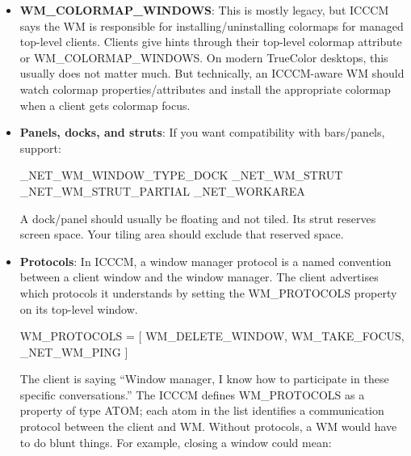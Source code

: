 \documentclass{report}
\begin{document}
\begin{itemize}
\begin{itemize}
                \item Otherwise return it to tiling layout.
                \item Re-run arrange()
            \end{itemize}
        \item \textbf{WM\_COLORMAP\_WINDOWS}:  
            This is mostly legacy, but ICCCM says the WM is responsible for installing/uninstalling colormaps for managed top-level clients. Clients give hints through their top-level colormap attribute or WM\_COLORMAP\_WINDOWS.
            \bigbreak \noindent 
            On modern TrueColor desktops, this usually does not matter much. But technically, an ICCCM-aware WM should watch colormap properties/attributes and install the appropriate colormap when a client gets colormap focus.
        \item \textbf{Panels, docks, and struts}: If you want compatibility with bars/panels, support:
            \bigbreak \noindent 
            \begin{cppcode}
                _NET_WM_WINDOW_TYPE_DOCK
                _NET_WM_STRUT
                _NET_WM_STRUT_PARTIAL
                _NET_WORKAREA
            \end{cppcode}
            \bigbreak \noindent 
            A dock/panel should usually be floating and not tiled. Its strut reserves screen space. Your tiling area should exclude that reserved space.
        \item \textbf{Protocols}: In ICCCM, a window manager protocol is a named convention between a client window and the window manager.
            \bigbreak \noindent 
            The client advertises which protocols it understands by setting the WM_PROTOCOLS property on its top-level window.
            \bigbreak \noindent 
            \begin{cppcode}
                WM_PROTOCOLS = [
                    WM_DELETE_WINDOW,
                    WM_TAKE_FOCUS,
                    _NET_WM_PING
                ]
            \end{cppcode}
            \bigbreak \noindent 
            The client is saying “Window manager, I know how to participate in these specific conversations.”
            \bigbreak \noindent 
            The ICCCM defines WM\_PROTOCOLS as a property of type ATOM; each atom in the list identifies a communication protocol between the client and WM.
            \bigbreak \noindent 
            Without protocols, a WM would have to do blunt things. For example, closing a window could mean:
            \bigbreak \noindent 

\end{itemize}
\end{document}
